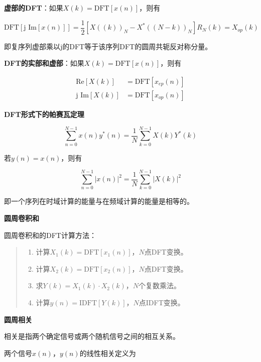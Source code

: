\documentclass[cn, hazy, blue, normal, 12pt]{elegantnote}
\begin{document}
\textbf{虚部的DFT}：如果$X(k)=\text{DFT}[x(n)]$，则有

\begin{equation}
    \text{DFT}[\text{j Im}[x(n)]]=\frac{1}{2}[X((k))_N-X^*((N-k))_N]R_N(k)=X_{op}(k)
\end{equation}

即复序列虚部乘以j的DFT等于该序列DFT的圆周共轭反对称分量。

\textbf{DFT的实部和虚部}：如果$X(k)=\text{DFT}[x(n)]$，则有

\begin{equation}
\begin{aligned}
    \text{Re}[X(k)]&=\text{DFT}[x_{ep}(n)] \\
    \text{j Im}[X(k)]&=\text{DFT}[x_{op}(n)]
\end{aligned}
\end{equation}

\textbf{DFT形式下的帕赛瓦定理}

\begin{equation}
    \sum_{n=0}^{N-1}{x(n)y^*(n)}=\frac{1}{N}\sum_{k=0}^{N-1}{X(k)Y^*(k)}
\end{equation}

若$y(n)=x(n)$，则有

\begin{equation}
    \sum_{n=0}^{N-1}{|x(n)|^2}=\frac{1}{N}\sum_{k=0}^{N-1}{|X(k)|^2}
\end{equation}

即一个序列在时域计算的能量与在频域计算的能量是相等的。

\textbf{圆周卷积和}

圆周卷积和的DFT计算方法：

\begin{quote}
\begin{enumerate}
    \item 计算$X_1(k)=\text{DFT}[x_1(n)]$，$N$点DFT变换。
    \item 计算$X_2(k)=\text{DFT}[x_2(n)]$，$N$点DFT变换。
    \item 求$Y(k)=X_1(k)\cdot X_2(k)$，$N$个复数乘法。
    \item 计算$y(n)=\text{IDFT}[Y(k)]$，$N$点IDFT变换。
\end{enumerate}
\end{quote}

\textbf{圆周相关}

相关是指两个确定信号或两个随机信号之间的相互关系。

两个信号$x(n)$，$y(n)$的线性相关定义为
\end{document}
